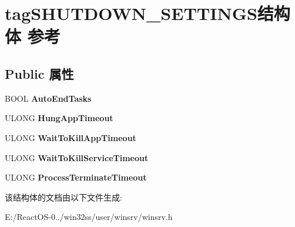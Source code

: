 \hypertarget{structtag_s_h_u_t_d_o_w_n___s_e_t_t_i_n_g_s}{}\section{tag\+S\+H\+U\+T\+D\+O\+W\+N\+\_\+\+S\+E\+T\+T\+I\+N\+G\+S结构体 参考}
\label{structtag_s_h_u_t_d_o_w_n___s_e_t_t_i_n_g_s}
\subsection*{Public 属性}
\begin{DoxyCompactItemize}
\item 
\mbox{\label{structtag_s_h_u_t_d_o_w_n___s_e_t_t_i_n_g_s_a7f5652436852e90e1fddd816d088f3e4}} 
B\+O\+OL {\bfseries Auto\+End\+Tasks}
\item 
\mbox{\label{structtag_s_h_u_t_d_o_w_n___s_e_t_t_i_n_g_s_a152e5e7c2ce8a6c2e0da1f2bbf3cedaa}} 
U\+L\+O\+NG {\bfseries Hung\+App\+Timeout}
\item 
\mbox{\label{structtag_s_h_u_t_d_o_w_n___s_e_t_t_i_n_g_s_a7b69ad87ab9b2a58ea9e127d4d41a4f2}} 
U\+L\+O\+NG {\bfseries Wait\+To\+Kill\+App\+Timeout}
\item 
\mbox{\label{structtag_s_h_u_t_d_o_w_n___s_e_t_t_i_n_g_s_a04dd171b15413541180c1dc8a36f79e1}} 
U\+L\+O\+NG {\bfseries Wait\+To\+Kill\+Service\+Timeout}
\item 
\mbox{\label{structtag_s_h_u_t_d_o_w_n___s_e_t_t_i_n_g_s_ae268a42718bb97c62a5af187cb370c21}} 
U\+L\+O\+NG {\bfseries Process\+Terminate\+Timeout}
\end{DoxyCompactItemize}


该结构体的文档由以下文件生成\+:\begin{DoxyCompactItemize}
\item 
E\+:/\+React\+O\+S-\/0../win32ss/user/winsrv/winsrv.\+h\end{DoxyCompactItemize}
